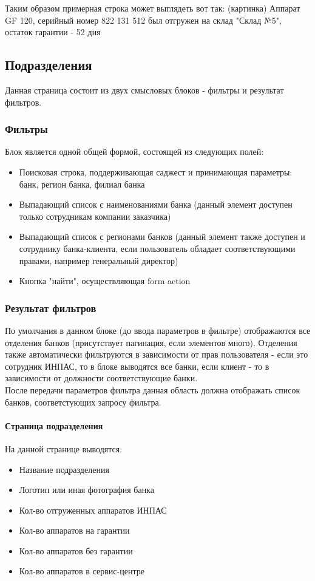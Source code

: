 \documentclass[DIV=calc, paper=a4, fontsize=11pt]{scrartcl} %
\begin{document}
Таким образом примерная строка может выглядеть вот так:
(картинка) Аппарат GF 120, серийный номер 822 131 512 был отгружен на склад "Склад №5", остаток гарантии - 52 дня

\subsection{Подразделения}
Данная страница состоит из двух смысловых блоков - фильтры и результат фильтров.

\subsubsection{Фильтры}
Блок является одной общей формой, состоящей из следующих полей:
\begin{itemize}
	\item Поисковая строка, поддерживающая саджест и принимающая параметры: банк, регион банка, филиал банка
	\item Выпадающий список с наименованиями банка (данный элемент доступен только сотрудникам компании заказчика)
	\item Выпадающий список с регионами банков (данный элемент также доступен и сотруднику банка-клиента, если пользователь обладает соответствующими правами, например генеральный директор)
	\item Кнопка "найти", осуществляющая form action 
\end{itemize}

\subsubsection{Результат фильтров}
По умолчания в данном блоке (до ввода параметров в фильтре) отображаются все отделения банков (присутствует пагинация, если элементов много). Отделения также автоматически фильтруются в зависимости от прав пользователя - если это сотрудник ИНПАС, то в блоке выводятся все банки, если клиент - то в зависимости от должности соответствующие банки.
\\[0.5cm]
После передачи параметров фильтра данная область должна отображать список банков, соответстующих запросу фильтра.

\paragraph{Страница подразделения}
На данной странице выводятся:

\begin{itemize}
	\item Название подразделения
	\item Логотип или иная фотография банка
	\item Кол-во отгруженных аппаратов ИНПАС
	\item Кол-во аппаратов на гарантии
	\item Кол-во аппаратов без гарантии
	\item Кол-во аппаратов в сервис-центре
\end{itemize}
\end{document}
